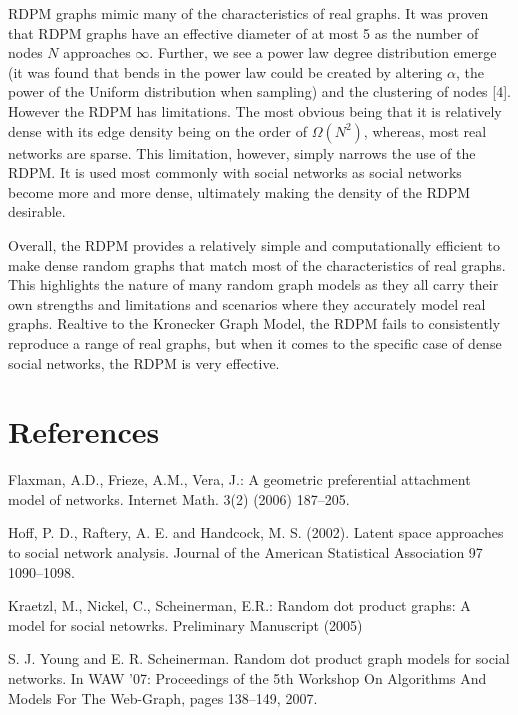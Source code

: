 \documentclass{article}
\begin{document}
RDPM graphs mimic many of the characteristics of real graphs. It was proven that RDPM graphs have an effective diameter of at most 5 as the number of nodes $N$ approaches $\infty$. Further, we see a power law degree distribution emerge (it was found that bends in the power law could be created by altering $\alpha$, the power of the Uniform distribution when sampling) and the clustering of nodes [4].
However the RDPM has limitations. The most obvious being that it is relatively dense with its edge density being on the order of $\Omega(N^2)$, whereas, most real networks are sparse. This limitation, however, simply narrows the use of the RDPM. It is used most commonly with social networks as social networks become more and more dense, ultimately making the density of the RDPM desirable.

Overall, the RDPM provides a relatively simple and computationally efficient to make dense random graphs that match most of the characteristics of real graphs. This highlights the nature of many random graph models as they all carry their own strengths and limitations and scenarios where they accurately model real graphs. Realtive to the Kronecker Graph Model, the RDPM fails to consistently reproduce a range of real graphs, but when it comes to the specific case of dense social networks, the RDPM is very effective.  

\section{References}

\begin{thebibliography}{9}
Flaxman, A.D., Frieze, A.M., Vera, J.: A geometric preferential attachment model
of networks. Internet Math. 3(2) (2006) 187–205.

Hoff, P. D., Raftery, A. E. and Handcock, M. S. (2002). Latent space approaches to social network analysis. Journal of the American Statistical Association 97 1090–1098.

Kraetzl, M., Nickel, C., Scheinerman, E.R.: Random dot product graphs: A model
for social netowrks. Preliminary Manuscript (2005)

S. J. Young and E. R. Scheinerman. Random dot product graph models for social networks. In
WAW ’07: Proceedings of the 5th Workshop On Algorithms And Models For The Web-Graph,
pages 138–149, 2007.
\end{thebibliography}
\end{document}
